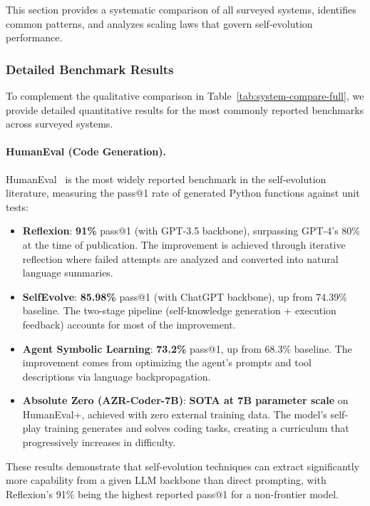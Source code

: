 This section provides a systematic comparison of all surveyed systems, identifies common patterns, and analyzes scaling laws that govern self-evolution performance.

\subsubsection{Detailed Benchmark Results}

To complement the qualitative comparison in Table~\ref{tab:system-compare-full}, we provide detailed quantitative results for the most commonly reported benchmarks across surveyed systems.

\paragraph{HumanEval (Code Generation).}
HumanEval~\citep{chen2021humaneval} is the most widely reported benchmark in the self-evolution literature, measuring the pass@1 rate of generated Python functions against unit tests:
\begin{itemize}
    \item \textbf{Reflexion}: \textbf{91\%} pass@1 (with GPT-3.5 backbone), surpassing GPT-4's 80\% at the time of publication. The improvement is achieved through iterative reflection where failed attempts are analyzed and converted into natural language summaries.
    \item \textbf{SelfEvolve}: \textbf{85.98\%} pass@1 (with ChatGPT backbone), up from 74.39\% baseline. The two-stage pipeline (self-knowledge generation + execution feedback) accounts for most of the improvement.
    \item \textbf{Agent Symbolic Learning}: \textbf{73.2\%} pass@1, up from 68.3\% baseline. The improvement comes from optimizing the agent's prompts and tool descriptions via language backpropagation.
    \item \textbf{Absolute Zero (AZR-Coder-7B)}: \textbf{SOTA at 7B parameter scale} on HumanEval+, achieved with zero external training data. The model's self-play training generates and solves coding tasks, creating a curriculum that progressively increases in difficulty.
\end{itemize}
These results demonstrate that self-evolution techniques can extract significantly more capability from a given LLM backbone than direct prompting, with Reflexion's 91\% being the highest reported pass@1 for a non-frontier model.

